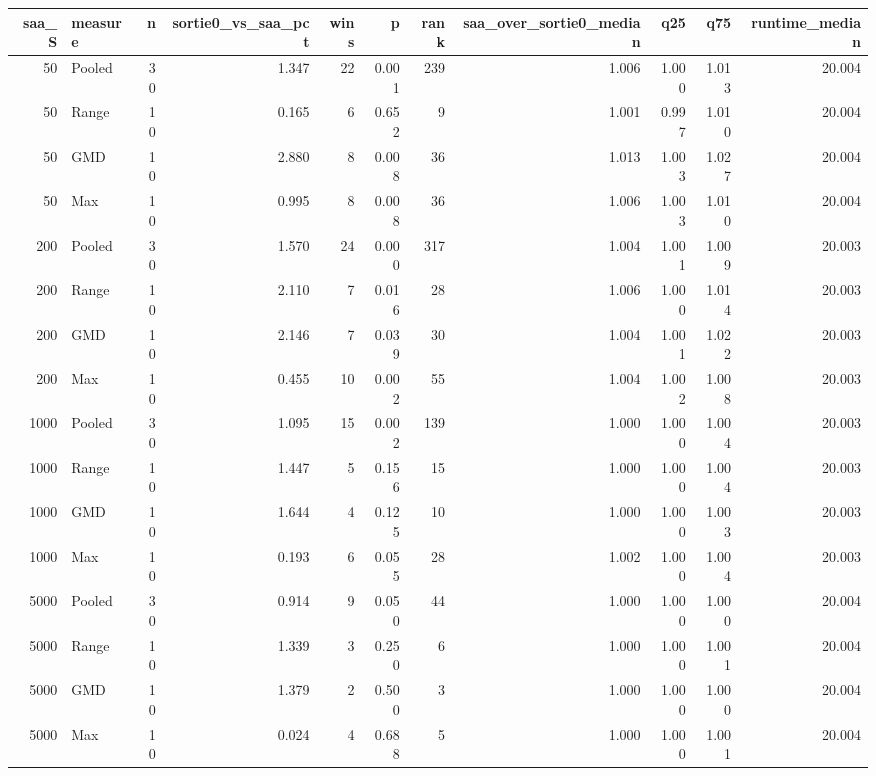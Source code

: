 \begin{tabular}{rlrrrrrrrrr}
\toprule
saa\_S & measure & n & sortie0\_vs\_saa\_pct & wins & p & rank & saa\_over\_sortie0\_median & q25 & q75 & runtime\_median \\
\midrule
50 & Pooled & 30 & 1.347 & 22 & 0.001 & 239 & 1.006 & 1.000 & 1.013 & 20.004 \\
50 & Range & 10 & 0.165 & 6 & 0.652 & 9 & 1.001 & 0.997 & 1.010 & 20.004 \\
50 & GMD & 10 & 2.880 & 8 & 0.008 & 36 & 1.013 & 1.003 & 1.027 & 20.004 \\
50 & Max & 10 & 0.995 & 8 & 0.008 & 36 & 1.006 & 1.003 & 1.010 & 20.004 \\
200 & Pooled & 30 & 1.570 & 24 & 0.000 & 317 & 1.004 & 1.001 & 1.009 & 20.003 \\
200 & Range & 10 & 2.110 & 7 & 0.016 & 28 & 1.006 & 1.000 & 1.014 & 20.003 \\
200 & GMD & 10 & 2.146 & 7 & 0.039 & 30 & 1.004 & 1.001 & 1.022 & 20.003 \\
200 & Max & 10 & 0.455 & 10 & 0.002 & 55 & 1.004 & 1.002 & 1.008 & 20.003 \\
1000 & Pooled & 30 & 1.095 & 15 & 0.002 & 139 & 1.000 & 1.000 & 1.004 & 20.003 \\
1000 & Range & 10 & 1.447 & 5 & 0.156 & 15 & 1.000 & 1.000 & 1.004 & 20.003 \\
1000 & GMD & 10 & 1.644 & 4 & 0.125 & 10 & 1.000 & 1.000 & 1.003 & 20.003 \\
1000 & Max & 10 & 0.193 & 6 & 0.055 & 28 & 1.002 & 1.000 & 1.004 & 20.003 \\
5000 & Pooled & 30 & 0.914 & 9 & 0.050 & 44 & 1.000 & 1.000 & 1.000 & 20.004 \\
5000 & Range & 10 & 1.339 & 3 & 0.250 & 6 & 1.000 & 1.000 & 1.001 & 20.004 \\
5000 & GMD & 10 & 1.379 & 2 & 0.500 & 3 & 1.000 & 1.000 & 1.000 & 20.004 \\
5000 & Max & 10 & 0.024 & 4 & 0.688 & 5 & 1.000 & 1.000 & 1.001 & 20.004 \\
\bottomrule
\end{tabular}
